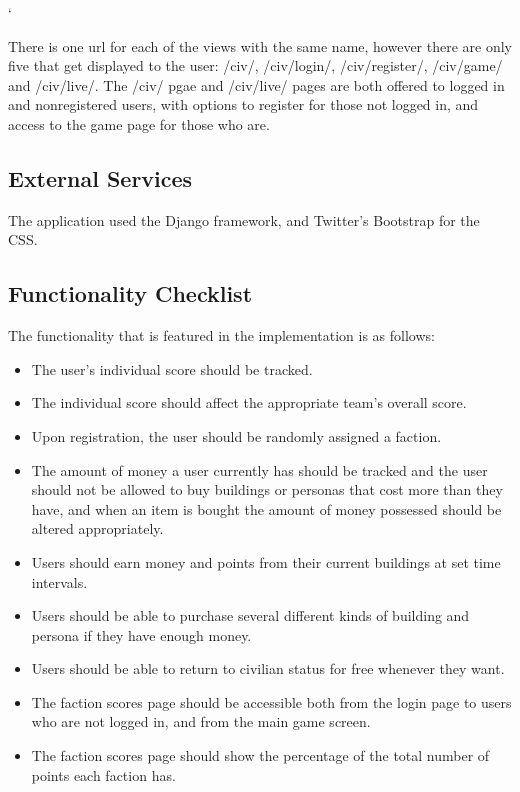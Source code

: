 `\documentclass{sig-alt-release2}
\begin{document}
There is one url for each of the views with the same name, however there are only five that get displayed to the user: /civ/, /civ/login/, /civ/register/, /civ/game/ and /civ/live/. The /civ/ pgae and /civ/live/ pages are both offered to logged in and nonregistered users, with options to register for those not logged in, and access to the game page for those who are.

\subsection{External Services}

The application used the Django framework, and Twitter's Bootstrap for the CSS. 

\subsection{Functionality Checklist}

The functionality that is featured in the implementation is as follows:

\begin{itemize}

\item The user's individual score should be tracked.

\item The individual score should affect the appropriate team's overall score.

\item Upon registration, the user should be randomly assigned a faction.

\item The amount of money a user currently has should be tracked and the user should not be allowed to buy buildings or personas that cost more than they have, and when an item is bought the amount of money possessed should be altered appropriately.

\item Users should earn money and points from their current buildings at set time intervals.

\item Users should be able to purchase several different kinds of building and persona if they have enough money.

\item Users should be able to return to civilian status for free whenever they want.

\item The faction scores page should be accessible both from the login page to users who are not logged in, and from the main game screen.

\item The faction scores page should show the percentage of the total number of points each faction has.

\end{itemize}
\end{document}

